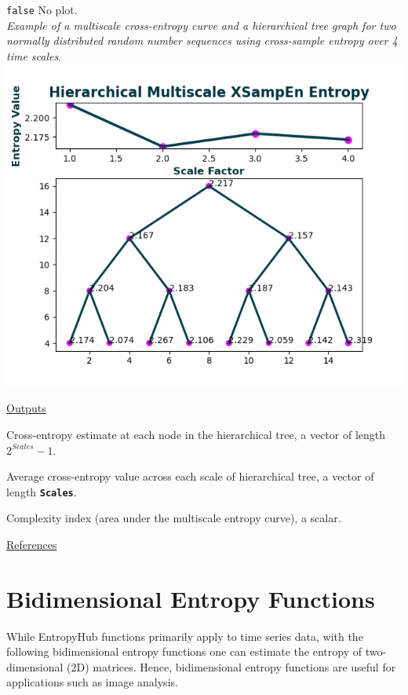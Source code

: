 \documentclass[12pt, a4paper, titlepage, openany]{book}
\begin{document}
\begin{description}[labelsep=1cm, labelwidth=2cm, nosep, style=multiline,leftmargin=3cm]
							\texttt{false}\hspace{12pt} No plot.\\ 
		\textit{Example of a multiscale cross-entropy curve and a hierarchical tree graph for two normally distributed random number sequences using cross-sample entropy over 4 time scales}.\\
							\includegraphics[scale=.65]{hXMSEn1.png}
\end{description}

\noindent \ul{Outputs}
\begin{description}[labelsep=1cm, labelwidth=2cm, nosep, style=multiline,leftmargin=3cm]\footnotesize
\item[\texttt{MSx}]		Cross-entropy estimate at each node in the hierarchical tree, a vector of length $2^{Scales}-1$.
\item[\texttt{Sn}]		Average cross-entropy value across each scale of hierarchical tree, a vector of length \texttt{\textbf{Scales}}.
\item[\texttt{Ci}]		Complexity index (area under the multiscale entropy curve), a scalar.
\end{description}

\noindent \ul{References}\hspace{1cm}
\cite{hMS1} 



\newpage
\section{Bidimensional Entropy Functions}
\vspace{3em}
\normalsize
While EntropyHub functions primarily apply to time series data, with the following bidimensional entropy functions one can estimate the entropy of two-dimensional (2D) matrices. Hence, bidimensional entropy functions are useful for applications such as image analysis. \\
\end{document}
